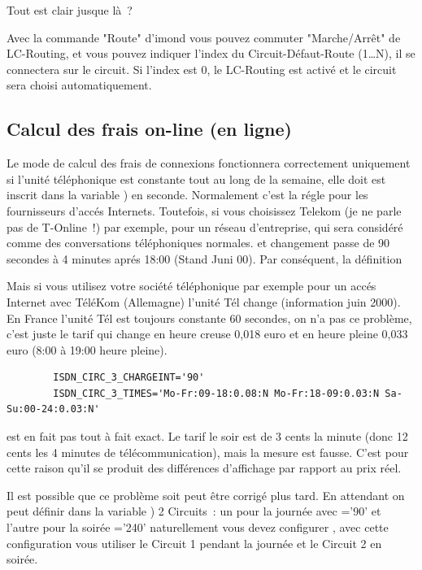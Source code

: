   Tout est clair jusque là~?

  Avec la commande "Route" d'imond vous pouvez commuter "Marche/Arrêt"
  de LC-Routing, et vous pouvez indiquer l'index du Circuit-Défaut-Route
  (1\ldots N), il se connectera sur le circuit. Si l'index est 0, le
  LC-Routing est activé et le circuit sera choisi automatiquement.

  \subsection{Calcul des frais on-line (en ligne)}

  Le mode de calcul des frais de connexions fonctionnera correctement
  uniquement si l'unité téléphonique est constante tout au long
  de la semaine, elle doit est inscrit dans la variable
  ) en seconde. Normalement c'est la
  régle pour les fournisseurs d'accés Internets. Toutefois, si vous choisissez
  Telekom (je ne parle pas de T-Online~!) par exemple, pour un réseau
  d'entreprise, qui sera considéré comme des conversations téléphoniques normales.
  et changement passe de 90 secondes à 4 minutes aprés 18:00 (Stand Juni
  00). Par conséquent, la définition

   Mais si vous utilisez votre
  société téléphonique par exemple pour un accés Internet avec TéléKom
  (Allemagne) l'unité Tél change (information juin 2000).\\
  En France l'unité Tél est toujours constante 60 secondes, on n'a
  pas ce problème, c'est juste le tarif qui change en heure creuse
  0,018 euro et en heure pleine 0,033 euro (8:00 à 19:00 heure pleine).

\begin{example}
\begin{verbatim}
        ISDN_CIRC_3_CHARGEINT='90'
        ISDN_CIRC_3_TIMES='Mo-Fr:09-18:0.08:N Mo-Fr:18-09:0.03:N Sa-Su:00-24:0.03:N'
\end{verbatim}
\end{example}

  est en fait pas tout à fait exact. Le tarif le soir est de 3 cents la minute
  (donc 12 cents les 4 minutes de télécommunication), mais la mesure est fausse.
  C'est pour cette raison qu'il se produit des différences d'affichage par
  rapport au prix réel.

  Il est possible que ce problème soit peut être corrigé plus tard.
  En attendant on peut définir dans la variable )
  2 Circuits~: un pour la journée avec ='90'
  et l'autre pour la soirée ='240'
  naturellement vous devez configurer ,
  avec cette configuration vous utiliser le Circuit 1 pendant la journée
  et le Circuit 2 en soirée.

